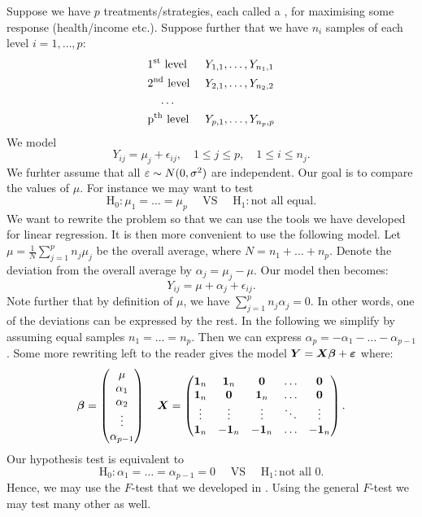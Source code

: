 Suppose we have $p$ treatments/strategies, each called a , for maximising some response (health/income etc.). Suppose further that we have $n_i$ samples of each level $i=1,\dots,p$:
\begin{align*}
    &\textrm{1\textsuperscript{st} level }     && Y_{1,1}, \dots, Y_{n_1,1} \\
    &\textrm{2\textsuperscript{nd} level }     && Y_{2,1}, \dots, Y_{n_2,2} \\
    &\quad\dots  && \\ 
    &\textrm{p\textsuperscript{th} level }     && Y_{p,1}, \dots, Y_{n_p,p}
\end{align*}
We model 
$$
    Y_{ij} = \mu_j + \epsilon_{ij}, \quad 1\leq j \leq p, \quad 1\leq i \leq n_j.
$$
We furhter assume that all $\varepsilon\sim N(0,\sigma^2)$ are independent. Our goal is to compare the values of $\mu$. For instance we may want to test
$$
    \mathrm{H}_0: \mu_1=\dots=\mu_p \quad\textrm{ VS }\quad \mathrm{H}_1:\textrm{not all equal}.
$$
We want to rewrite the problem so that we can use the tools we have developed for linear regression. It is then more convenient to use the following model. Let $\mu = \frac{1}{N}\sum_{j=1}^p n_j \mu_j$ be the overall average, where $N=n_1+\dots+n_p$. Denote the deviation from the overall average by $\alpha_j = \mu_j - \mu$. Our model then becomes:
$$
    Y_{ij} = \mu + \alpha_j + \epsilon_{ij}.
$$
Note further that by definition of $\mu$, we have $\sum_{j=1}^p n_j \alpha_j = 0$. In other words, one of the deviations can be expressed by the rest. In the following we simplify by assuming equal samples $n_1=\dots=n_p$. Then we can express $\alpha_p = -\alpha_1-\dots-\alpha_{p-1}$. Some more rewriting left to the reader gives the model $\boldsymbol{Y}=\boldsymbol{X}\boldsymbol{\beta} + \boldsymbol{\varepsilon}$ where:
$$
    \boldsymbol{\beta} = 
    \begin{pmatrix}
        \mu \\ \alpha_1 \\ \alpha_{2} \\ \vdots \\ \alpha_{p-1}
    \end{pmatrix}
    \quad
    \boldsymbol{X} = 
    \begin{pmatrix}
        \boldsymbol{1}_n & \boldsymbol{1}_n & \boldsymbol{0} & \hdots & \boldsymbol{0}\\
        \boldsymbol{1}_n & \boldsymbol{0} & \boldsymbol{1}_n & \hdots & \boldsymbol{0}\\
        \vdots & \vdots & \vdots & \ddots & \vdots\\
        \boldsymbol{1}_n & -\boldsymbol{1}_n & -\boldsymbol{1}_n & \hdots & -\boldsymbol{1}_n\\
    \end{pmatrix}
    .
$$
Our hypothesis test is equivalent to 
$$
    \mathrm{H}_0: \alpha_1=\dots=\alpha_{p-1}=0 \quad\textrm{ VS }\quad \mathrm{H}_1:\textrm{not all }0.
$$
Hence, we may use the $F$-test that we developed in . Using the general $F$-test we may test many other as well.
